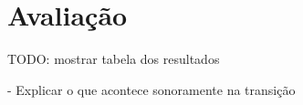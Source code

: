 \section{Avaliação}


TODO: mostrar tabela dos resultados

- Explicar o que acontece sonoramente na transição
